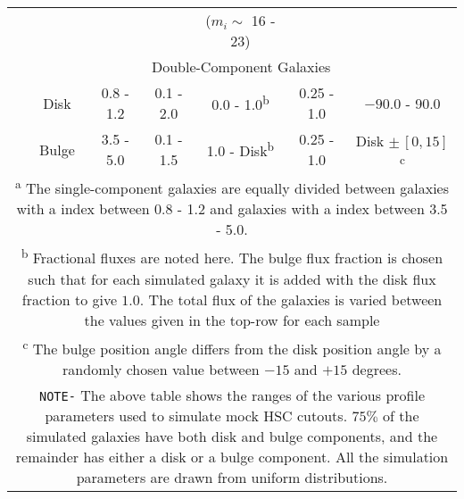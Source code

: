\begin{table}[htbp]
\begin{tabular}{c|cccccc}
        & & & & ($m_i \sim $ 16 - 23) & & \\
        \cline{2-7}
        & \multicolumn{6}{c}{Double-Component Galaxies} \\
        & Disk & 0.8 - 1.2 & 0.1 - 2.0 & 0.0 - 1.0\textsuperscript{b} & 0.25 - 1.0 & $-90.0$ - 90.0\\
        & Bulge & 3.5 - 5.0 & 0.1 - 1.5 & 1.0 - Disk\textsuperscript{b} & 0.25 - 1.0 &  Disk $\pm\,[0,15]$\textsuperscript{c} \\
        \hline
        \multicolumn{7}{p{0.95\textwidth}}{\vskip 0.01cm \small \textsuperscript{a} The single-component galaxies are equally divided between galaxies with a \sersic{} index between 0.8 - 1.2 and galaxies with a \sersic{} index between 3.5 - 5.0.} \\
        \multicolumn{7}{p{0.95\textwidth}}{\small \textsuperscript{b} Fractional fluxes are noted here. The bulge flux fraction is chosen such that for each simulated galaxy it is added with the disk flux fraction to give $1.0$. The total flux of the galaxies is varied between the values given in the top-row for each sample} \\
        \multicolumn{7}{p{0.95\textwidth}}{\small \textsuperscript{c} The bulge position angle differs from the disk position angle by a randomly chosen value between $-15$ and $+15$ degrees.} \\
        \multicolumn{7}{p{0.95\textwidth}}{\small \texttt{NOTE-} The above table shows the ranges of the various \sersic{} profile parameters used to simulate mock HSC cutouts. $75\%$ of the simulated galaxies have both disk and bulge components, and the remainder has either a disk or a bulge component. All the simulation parameters are drawn from uniform distributions.} \\
    \end{tabular}
    \end{table}

